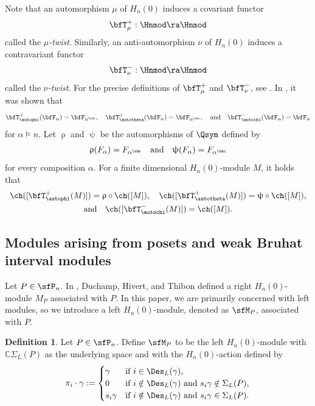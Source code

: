 \documentclass[12pt, reqno]{amsart}
\theoremstyle{definition}
\newtheorem{definition}[theorem]{Definition}
\numberwithin{equation}{section} \numberwithin{figure}{section}
\numberwithin{table}{section}
\def\C{\mathbb C}
\begin{document}
Note that an automorphism $\mu$ of $H_n(0)$  induces a covariant functor
\[
\bfT^{+}_\mu: \Hnmod \ra \Hnmod
\]
called the  \emph{$\mu$-twist}.
Similarly, an anti-automorphism $\nu$ of $H_n(0)$ induces a contravariant functor \[
\bfT^{-}_\nu: \Hnmod \ra \Hnmod
\]
called the \emph{$\nu$-twist}.
For the precise definitions of $\bfT^{+}_\mu$ and $\bfT^{-}_\nu$, see \cite[Subsection 3.4]{22JKLO}.
In \cite[Proposition 3.3.]{05Fayers}, it was shown that
\[
\bfT^{+}_\autophi(\bfF_\alpha) = \bfF_{\alpha^\rmr},
\quad
\bfT^{+}_\autotheta(\bfF_\alpha) = \bfF_{\alpha^\rmc},
\quad \text{and} \quad
\bfT^{-}_\autochi(\bfF_\alpha) = \bfF_{\alpha}
\]
for  $\alpha \models n$.
Let $\uprho$ and $\uppsi$ be the automorphisms  of $\Qsym$ defined by
\begin{align*}
\uprho(F_\alpha) = F_{\alpha^\rmr}
\quad \text{and} \quad
\uppsi(F_\alpha) = F_{\alpha^\rmc}
\end{align*}
for every composition $\alpha$.
For a finite dimensional $H_n(0)$-module $M$, it holds that 
\begin{align}\label{lifts of involutions on QSYM}
\begin{array}{c}
\ch( [\bfT^{+}_\autophi(M)] ) = \uprho \circ \ch([M]), 
\quad
\ch ( [\bfT^{+}_\autotheta(M)] )  = \uppsi \circ \ch([M]),\\[1ex]
\text{and} \quad
\ch ( [\bfT^{-}_\autochi(M)] ) =  \ch([M]).
\end{array}
\end{align}









\subsection{Modules arising from posets and weak Bruhat interval modules}
Let $P\in \sfP_n$. In \cite[Definition 3.18]{02DHT}, Duchamp, Hivert, and Thibon defined a right $H_n(0)$-module $M_P$ associated with $P$. In this paper, we are primarily concerned with left modules, so we introduce a left $H_n(0)$-module, denoted as $\sfM_P$, associated with $P$.



\begin{definition}\label{def: poset module}
Let $P \in \sfP_n$. 
Define $\sfM_P$ to be the left $H_n(0)$-module with $\C \Sigma_{L}(P)$ as the underlying space and with the $H_n(0)$-action defined by
\begin{align}\label{left action}
\pi_{i} \cdot \gamma :=
\begin{cases}
\gamma & \text{if $i \in \Des_L(\gamma)$}, \\
0 & \text{if $i \notin \Des_L(\gamma)$ and $s_i\gamma \notin \Sigma_{L}(P)$,} \\
s_i \gamma & \text{if $i \notin \Des_L(\gamma)$ and $s_i\gamma \in \Sigma_{L}(P)$}.
\end{cases} 
\end{align}
\end{definition}
\end{document}
